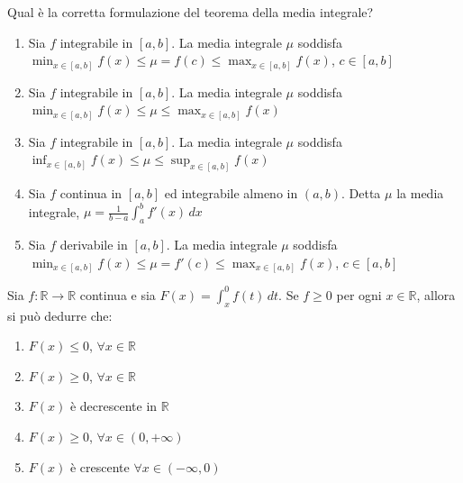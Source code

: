\begin{quiz}
Qual \`e la corretta formulazione del teorema della media integrale?
\begin{enumerate}
\item Sia $f$ integrabile in $[a,b]$. La media integrale $\mu$ soddisfa $\min_{x\in[a,b]}f(x)\le\mu=f(c)\le\max_{x\in[a,b]}f(x)$, $c\in[a,b]$
\item Sia $f$ integrabile in $[a,b]$. La media integrale $\mu$ soddisfa $\min_{x\in[a,b]}f(x)\le\mu\le\max_{x\in[a,b]}f(x)$
\item Sia $f$ integrabile in $[a,b]$. La media integrale $\mu$ soddisfa $\inf_{x\in[a,b]}f(x)\le\mu\le\sup_{x\in[a,b]}f(x)$
\item Sia $f$ continua in $[a,b]$ ed integrabile almeno in $(a,b)$. Detta $\mu$ la media integrale, $\mu=\frac1{b-a}\int_a^b f\prime(x)\,dx$
\item Sia $f$ derivabile in $[a,b]$. La media integrale $\mu$ soddisfa $\min_{x\in[a,b]}f(x)\le\mu=f\prime(c)\le\max_{x\in[a,b]}f(x)$, $c\in[a,b]$
\end{enumerate}
\end{quiz}

\begin{quiz}
Sia $f:\mathbb R\to\mathbb R$ continua e sia $F(x)=\int_x^0 f(t)\,dt$. Se $f\ge0$ per ogni $x\in\mathbb R$, allora si pu\`o dedurre che:
\begin{enumerate}
\item $F(x)\le0$, $\forall x\in\mathbb R$
\item $F(x)\ge0$, $\forall x\in\mathbb R$
\item $F(x)$ \`e decrescente in $\mathbb R$
\item $F(x)\ge0$, $\forall x\in(0,+\infty)$
\item $F(x)$ \`e crescente $\forall x\in(-\infty,0)$
\end{enumerate}
\end{quiz}

